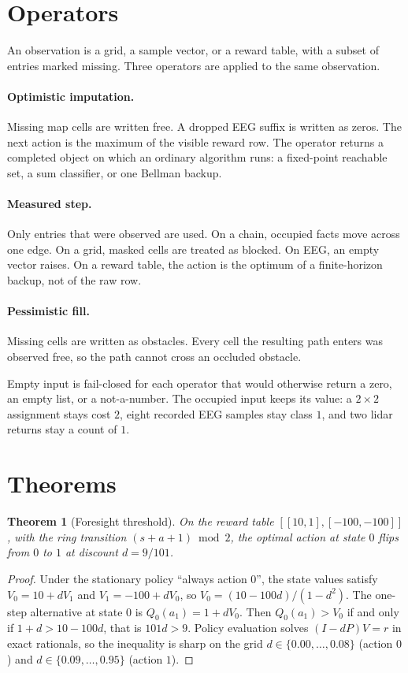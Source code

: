 \documentclass[10pt,twocolumn,letterpaper]{article}
\newtheorem{theorem}{Theorem}
\begin{document}
\section{Operators}
\label{sec:ops}

An observation is a grid, a sample vector, or a reward table, with a subset of entries marked missing.
Three operators are applied to the same observation.

\paragraph{Optimistic imputation.}
Missing map cells are written free.
A dropped EEG suffix is written as zeros.
The next action is the maximum of the visible reward row.
The operator returns a completed object on which an ordinary algorithm runs: a fixed-point reachable set, a sum classifier, or one Bellman backup.

\paragraph{Measured step.}
Only entries that were observed are used.
On a chain, occupied facts move across one edge.
On a grid, masked cells are treated as blocked.
On EEG, an empty vector raises.
On a reward table, the action is the optimum of a finite-horizon backup, not of the raw row.

\paragraph{Pessimistic fill.}
Missing cells are written as obstacles.
Every cell the resulting path enters was observed free, so the path cannot cross an occluded obstacle.

Empty input is fail-closed for each operator that would otherwise return a zero, an empty list, or a not-a-number.
The occupied input keeps its value: a $2{\times}2$ assignment stays cost $2$, eight recorded EEG samples stay class $1$, and two lidar returns stay a count of $1$.

\section{Theorems}

\begin{theorem}[Foresight threshold]
On the reward table $[[10,1],[-100,-100]]$, with the ring transition $(s+a+1)\bmod 2$, the optimal action at state $0$ flips from $0$ to $1$ at discount $d=9/101$.
\end{theorem}
\begin{proof}
Under the stationary policy ``always action $0$'', the state values satisfy $V_0=10+dV_1$ and $V_1=-100+dV_0$, so $V_0=(10-100d)/(1-d^2)$.
The one-step alternative at state $0$ is $Q_0(a_1)=1+dV_0$.
Then $Q_0(a_1)>V_0$ if and only if $1+d>10-100d$, that is $101d>9$.
Policy evaluation solves $(I-dP)V=r$ in exact rationals, so the inequality is sharp on the grid $d\in\{0.00,\ldots,0.08\}$ (action $0$) and $d\in\{0.09,\ldots,0.95\}$ (action $1$).
\end{proof}
\end{document}
